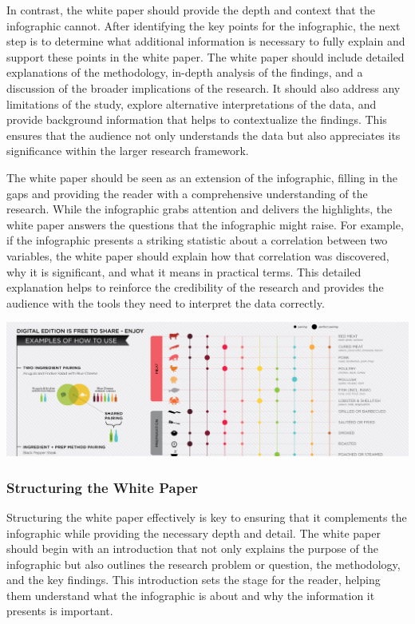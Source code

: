 \documentclass[
]{book}
\begin{document}
In contrast, the white paper should provide the depth and context that the infographic cannot. After identifying the key points for the infographic, the next step is to determine what additional information is necessary to fully explain and support these points in the white paper. The white paper should include detailed explanations of the methodology, in-depth analysis of the findings, and a discussion of the broader implications of the research. It should also address any limitations of the study, explore alternative interpretations of the data, and provide background information that helps to contextualize the findings. This ensures that the audience not only understands the data but also appreciates its significance within the larger research framework.

The white paper should be seen as an extension of the infographic, filling in the gaps and providing the reader with a comprehensive understanding of the research. While the infographic grabs attention and delivers the highlights, the white paper answers the questions that the infographic might raise. For example, if the infographic presents a striking statistic about a correlation between two variables, the white paper should explain how that correlation was discovered, why it is significant, and what it means in practical terms. This detailed explanation helps to reinforce the credibility of the research and provides the audience with the tools they need to interpret the data correctly.

\href{https://winefolly.com/deep-dive/simple-food-and-wine-pairing/}{\includegraphics[width=1\textwidth,height=\textheight]{images/infographic.jpg}}

\subsubsection*{Structuring the White Paper}\label{structuring-the-white-paper}

Structuring the white paper effectively is key to ensuring that it complements the infographic while providing the necessary depth and detail. The white paper should begin with an introduction that not only explains the purpose of the infographic but also outlines the research problem or question, the methodology, and the key findings. This introduction sets the stage for the reader, helping them understand what the infographic is about and why the information it presents is important.
\end{document}
